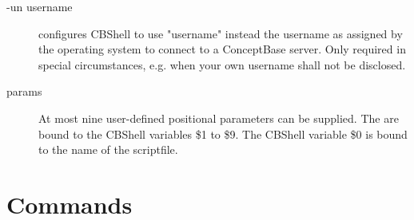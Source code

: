 \begin{description}
\item[-un username] configures CBShell to use "username" instead the username as assigned by the 
operating system to connect to a ConceptBase server. Only required in special circumstances, e.g.
when your own username shall not be disclosed.

\item[params] At most nine user-defined positional parameters can be supplied. The are bound
to the CBShell variables \$1 to \$9. The CBShell variable \$0 is bound to the name of the scriptfile.

\end{description}


\section{Commands}


